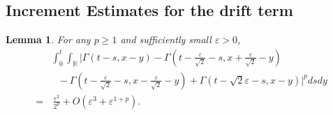 \documentclass[11pt,reqno]{amsart}
\numberwithin{equation}{section}
\newtheorem{lemma}{Lemma}[section]
\newcommand{\1}{{\bf 1}}
\newcommand{\2}{{\bf 2}}
\begin{document}
 \subsection{Increment Estimates for  the drift term}
  \begin{lemma}\label{lem G increm} For any $p\ge 1$ and sufficiently small   $\varepsilon>0$, 
\begin{equation}\label{eq:kernel_increment}
\begin{split}
& \int_0^t   \int_{\mathbb R}        \Bigg|  \Gamma(t-s, x-y)-\Gamma\left(t-\frac{\varepsilon}{\sqrt{2}}-s,x+\frac{\varepsilon}{\sqrt{2}}-y\right)\\
  &\,\,\,\,   -\Gamma\left(t-\frac{\varepsilon}{\sqrt{2}}-s, x-\frac{\varepsilon}{\sqrt{2}}-y\right)+\Gamma\left(t- \sqrt{2} \varepsilon-s, x-y\right)  \Bigg|^{p} dsdy \\
  =&\,  \frac{\varepsilon^{2}}{2^{p}}  +O\left(\varepsilon^{3}+\varepsilon^{1+p}\right). 
     \end{split}
  \end{equation}
\end{lemma}   
\end{document}
